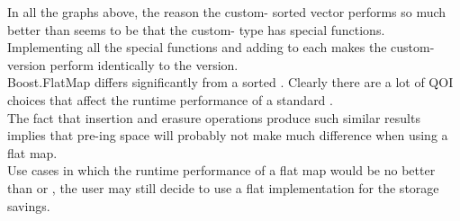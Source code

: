 In all the graphs above, the reason the custom- sorted vector
performs so much better than  seems to be that
the custom- type has  special functions.
Implementing all the special functions and adding  to
each makes the custom- version perform identically to the
 version.\\

Boost.FlatMap differs significantly from a sorted .  Clearly
there are a lot of QOI choices that affect the runtime performance of a
standard .\\

The fact that insertion and erasure operations produce such similar results
implies that pre-ing space will probably not make much
difference when using a flat map.\\

Use cases in which the runtime performance of a flat map would be no better
than  or , the user may still decide to use a
flat implementation for the storage savings.
